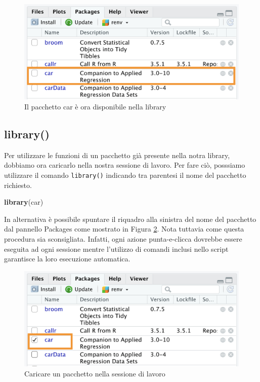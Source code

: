 \documentclass[
]{book}
\newenvironment{Shaded}{\begin{snugshade}}{\end{snugshade}}
\newcommand{\KeywordTok}[1]{\textcolor[rgb]{0.13,0.29,0.53}{\textbf{#1}}}
\newcommand{\NormalTok}[1]{#1}
\begin{document}
\begin{figure}

{\centering \includegraphics[width=0.65\linewidth]{images/library-car} 

}

\caption{Il pacchetto car è ora disponibile nella library}\label{fig:library-car}
\end{figure}

\hypertarget{library}{%
\subsection{library()}\label{library}}

Per utilizzare le funzioni di un pacchetto già presente nella notra library, dobbiamo ora caricarlo nella nostra sessione di lavoro. Per fare ciò, posssiamo utilizzare il comando \texttt{library()} indicando tra parentesi il nome del pacchetto richiesto.

\begin{Shaded}
\begin{Highlighting}[]
\KeywordTok{library}\NormalTok{(car)}
\end{Highlighting}
\end{Shaded}

In alternativa è possibile spuntare il riquadro alla sinistra del nome del pacchetto dal pannello Packages come mostrato in Figura \ref{fig:load-package}. Nota tuttavia come questa procedura sia sconsigliata. Infatti, ogni azione punta-e-clicca dovrebbe essere eseguita ad ogni sessione mentre l'utilizzo di comandi inclusi nello script garantisce la loro esecuzione automatica.

\begin{figure}

{\centering \includegraphics[width=0.65\linewidth]{images/load-package} 

}

\caption{Caricare un pacchetto nella sessione di lavoro}\label{fig:load-package}
\end{figure}
\end{document}
